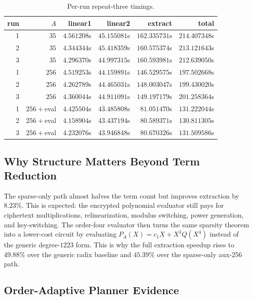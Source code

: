 \documentclass[a4paper,runningheads]{llncs}
\begin{document}
\begin{table}[t]
\centering
\caption{Per-run repeat-three timings.}
\label{tab:per_run}
\scriptsize
\begin{tabular}{rrrrrr}
\toprule
\textbf{run} & \textbf{$A$} & \textbf{linear1} & \textbf{linear2} &
\textbf{extract} & \textbf{total} \\
\midrule
1 & $35$ & $4.561208$s & $45.155081$s & $162.335731$s & $214.407348$s \\
2 & $35$ & $4.344344$s & $45.418359$s & $160.575374$s & $213.121643$s \\
3 & $35$ & $4.296370$s & $44.997315$s & $160.593981$s & $212.639050$s \\
1 & $256$ & $4.519253$s & $44.159891$s & $146.529575$s & $197.502668$s \\
2 & $256$ & $4.262789$s & $44.465031$s & $148.003047$s & $199.430020$s \\
3 & $256$ & $4.360044$s & $44.911091$s & $149.197179$s & $201.258364$s \\
1 & $256+$eval & $4.425504$s & $43.485808$s & $81.051470$s & $131.222044$s \\
2 & $256+$eval & $4.158904$s & $43.437194$s & $80.589371$s & $130.811305$s \\
3 & $256+$eval & $4.232076$s & $43.946848$s & $80.670326$s & $131.509586$s \\
\bottomrule
\end{tabular}
\end{table}

\subsection{Why Structure Matters Beyond Term Reduction}

The sparse-only path almost halves the term count but improves extraction by
$8.23\%$.  This is expected: the encrypted polynomial evaluator still pays for
ciphertext multiplications, relinearization, modulus switching, power
generation, and key-switching.  The order-four evaluator then turns the same
sparsity theorem into a lower-cost circuit by evaluating
$P_A(X)=c_1X+X^3Q(X^4)$ instead of the generic degree-$1223$ form.  This is
why the full extraction speedup rises to $49.88\%$ over the generic radix
baseline and $45.39\%$ over the sparse-only aux-256 path.

\subsection{Order-Adaptive Planner Evidence}
\end{document}
